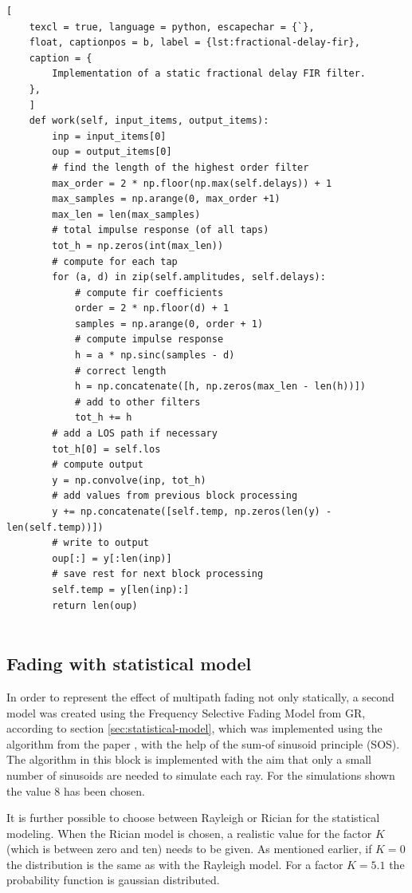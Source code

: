 \begin{lstlisting}[
	texcl = true, language = python, escapechar = {`},
	float, captionpos = b, label = {lst:fractional-delay-fir},
	caption = {
		Implementation of a static fractional delay FIR filter.
	},
	]
	def work(self, input_items, output_items):
		inp = input_items[0]
		oup = output_items[0]
		# find the length of the highest order filter
		max_order = 2 * np.floor(np.max(self.delays)) + 1
		max_samples = np.arange(0, max_order +1)
		max_len = len(max_samples)
		# total impulse response (of all taps)
		tot_h = np.zeros(int(max_len))
		# compute for each tap
		for (a, d) in zip(self.amplitudes, self.delays):
			# compute fir coefficients
			order = 2 * np.floor(d) + 1
			samples = np.arange(0, order + 1)
			# compute impulse response
			h = a * np.sinc(samples - d)
			# correct length
			h = np.concatenate([h, np.zeros(max_len - len(h))])
			# add to other filters
			tot_h += h
		# add a LOS path if necessary
		tot_h[0] = self.los
		# compute output
		y = np.convolve(inp, tot_h)
		# add values from previous block processing
		y += np.concatenate([self.temp, np.zeros(len(y) - len(self.temp))])
		# write to output
		oup[:] = y[:len(inp)]
		# save rest for next block processing
		self.temp = y[len(inp):]
		return len(oup)
	
\end{lstlisting}

\subsection{Fading with statistical model}

In order to represent the effect of multipath fading not only statically, a second model was created using the Frequency Selective Fading Model from GR, according to section \ref{sec:statistical-model}, which was implemented using the algorithm from the paper \cite{Alimohammad2009}, with the help of the sum-of sinusoid principle (SOS). The algorithm in this block is implemented with the aim that only a small number of sinusoids are needed to simulate each ray. For the simulations shown the value 8 has been chosen.

It is further possible to choose between Rayleigh or Rician for the statistical modeling. When the Rician model is chosen, a realistic value for the factor \(K\) (which is between zero and ten) needs to be given. As mentioned earlier, if \(K=0\) the distribution is the same as with the Rayleigh model. For a factor \(K = 5.1\) the probability function is gaussian distributed.

